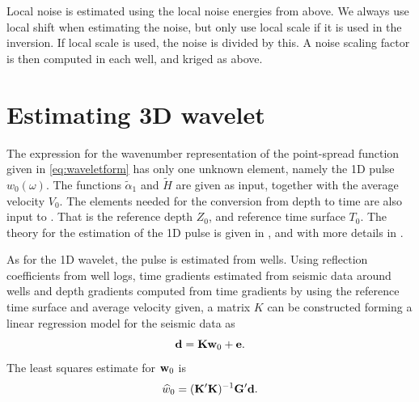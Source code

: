 Local noise is estimated using the local noise energies from above. We always use local shift when estimating the noise, but only use local scale if it is used in the inversion. If local scale is used, the noise is divided by this. A noise scaling factor is then computed in each well, and kriged as above.

\section{Estimating 3D wavelet}
\label{sec:3Dwaveestimp}
The expression for the wavenumber representation of the point-spread function given in \autoref{eq:waveletform}
has only one unknown element, namely the 1D pulse $w_0(\omega)$. The functions $\tilde{\alpha}_1$ and $\tilde{H}$ are given as input, together with the average velocity $V_0$. The elements needed for the conversion from depth to time are also input to \crava. That is the reference depth $Z_0$, and reference time surface $T_0$. The theory for the estimation of the 1D pulse is given in \cite{georgsen10}, and with more details in \cite{sand1010}.

As for the 1D wavelet, the pulse is estimated from wells. Using
reflection coefficients from well logs, time gradients estimated from
seismic data around wells and depth gradients computed from time
gradients by using the reference time surface and average velocity given, a matrix $K$ can be constructed forming a linear regression model for the seismic
data as
\begin{equation}
\mathbf{d} = \mathbf{K}\mathbf{w}_0 + \mathbf{e}.
\end{equation}
The least squares estimate for $\mathbf{w}_0$ is
\begin{equation}
\widehat{w}_0 = (\mathbf{K}'\mathbf{K})^{-1}\mathbf{G}'\mathbf{d}.
\end{equation}

